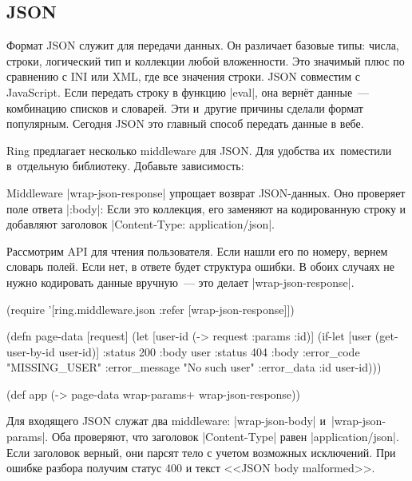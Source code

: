 \subsection{JSON}

Формат JSON служит для передачи данных. Он различает базовые типы: числа,
строки, логический тип и коллекции любой вложенности. Это значимый плюс по
сравнению с INI или XML, где все значения строки. JSON совместим с
JavaScript. Если передать строку в функцию \spverb|eval|, она верн\"{е}т данные~---
комбинацию списков и словарей. Эти и~другие причины сделали формат
популярным. Сегодня JSON это главный способ передать данные в вебе.

Ring предлагает несколько middleware для JSON. Для удобства их~поместили
в~отдельную библиотеку. Добавьте зависимость:

\begin{english}
  \begin{clojure}
  \end{clojure}
\end{english}

Middleware \spverb|wrap-json-response| упрощает возврат JSON-данных. Оно
проверяет поле ответа \spverb|:body|: Если это коллекция, его заменяют на
кодированную строку и добавляют заголовок \spverb|Content-Type: application/json|.

Рассмотрим API для чтения пользователя. Если нашли его по номеру, вернем словарь
полей. Если нет, в ответе будет структура ошибки. В обоих случаях не нужно
кодировать данные вручную~--- это делает \spverb|wrap-json-response|.

\begin{english}
  \begin{clojure}
(require '[ring.middleware.json
           :refer [wrap-json-response]])

(defn page-data [request]
  (let [user-id (-> request :params :id)]
    (if-let [user (get-user-by-id user-id)]
      {:status 200 :body user}
      {:status 404
       :body {:error_code "MISSING_USER"
              :error_message "No such user"
              :error_data {:id user-id}}})))

(def app (-> page-data
             wrap-params+
             wrap-json-response))
  \end{clojure}
\end{english}

Для входящего JSON служат два middleware: \spverb|wrap-json-body|
и~\spverb|wrap-json-params|. Оба проверяют, что заголовок \spverb|Content-Type|
равен \spverb|application/json|. Если заголовок верный, они парсят тело с учетом
возможных исключений. При ошибке разбора получим статус 400 и текст <<JSON body
malformed>>.

